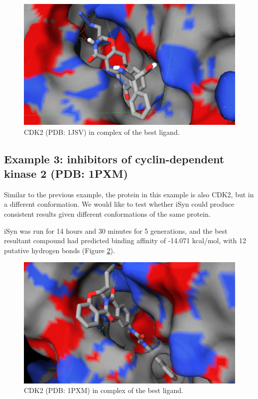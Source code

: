 \begin{figure}
\begin{center}
\includegraphics[width=\linewidth]{../isyn/1JSV.png}
\end{center}
\caption{CDK2 (PDB: 1JSV) in complex of the best ligand.}
\label{isyn:1JSV}
\end{figure}

\subsection{Example 3: inhibitors of cyclin-dependent kinase 2 (PDB: 1PXM)}

Similar to the previous example, the protein in this example is also CDK2, but in a different conformation. We would like to test whether iSyn could produce consistent results given different conformations of the same protein.

iSyn was run for 14 hours and 30 minutes for 5 generations, and the best resultant compound had predicted binding affinity of -14.071 kcal/mol, with 12 putative hydrogen bonds (Figure \ref{isyn:1PXM}).
 
\begin{figure}
\begin{center}
\includegraphics[width=\linewidth]{../isyn/1PXM.png}
\end{center}
\caption{CDK2 (PDB: 1PXM) in complex of the best ligand.}
\label{isyn:1PXM}
\end{figure}

